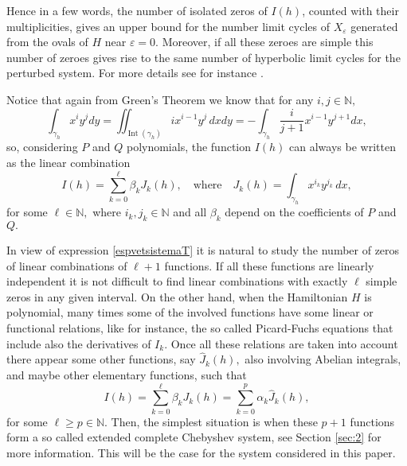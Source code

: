 \documentclass[12pt,a4paper,reqno]{amsart}
\newcommand{\N}{\mathbb{N}}
\begin{document}
      Hence in a few  words, the number of isolated zeros of $I (h)$, counted
with their multiplicities, gives
       an upper bound for the number limit cycles of $X_{\varepsilon}$  generated from the  ovals of $H$ near
       $\varepsilon=0.$ Moreover, if all these zeroes are simple this
       number of zeroes gives rise to the same number of hyperbolic
       limit cycles for the perturbed system.
       For more details see for instance  \cite{ChrLi2007,UrbHoss2017}.

    Notice that again from Green's Theorem we know that for any
    $i,j\in\N,$
    \begin{equation*}
    \displaystyle\int_{\gamma_h} x^i y^j dy  = \displaystyle\iint_{\operatorname{Int}(\gamma_h)} i x^{i-1} y ^j
     \,dx dy = -\displaystyle\int_{\gamma_h} \dfrac{i}{j+1} x^{i-1} y^{j+1} dx,
    \end{equation*}
    so, considering  $ P $ and $ Q $  polynomials, the function $I(h)$ can always be written as the linear combination
    \begin{equation}\label{espvetsistemaT}
    I(h)=\sum_{k=0}^\ell \beta_k J_k(h),\quad\mbox{where}\quad J_k(h)=\displaystyle\int_{\gamma_h} x^{i_k}
    y^{j_k}\,dx,
    \end{equation}
    for some $\ell\in\N,$ where  $i_k,j_k\in\N$ and  all $ \beta_k $ depend on the coefficients of $P$ and $Q.$

In view of expression \eqref{espvetsistemaT} it is natural to study
the number of zeros of linear combinations of $\ell+1$ functions. If
all these functions are linearly independent it is not difficult to
find linear combinations with exactly $\ell$ simple zeros in any
given interval. On the other hand, when the Hamiltonian $H$ is
polynomial,  many times some of the involved functions have some
linear or functional relations, like for instance, the so called
Picard-Fuchs equations that include also the derivatives of $I_k.$
Once all these relations are taken into account there appear some
other functions, say $\hat J_k(h),$ also involving Abelian
integrals, and maybe other elementary functions, such that
\[
I(h)=\sum_{k=0}^\ell \beta_k J_k(h)= \sum_{k=0}^p \alpha_k \hat
J_k(h),
\]
for some $\ell\ge p\in\N.$ Then, the simplest situation is when
these $p+1$ functions form a so called extended complete Chebyshev
system, see Section \ref{sec:2} for more information. This will be
the case for the system considered in this paper.
\end{document}
